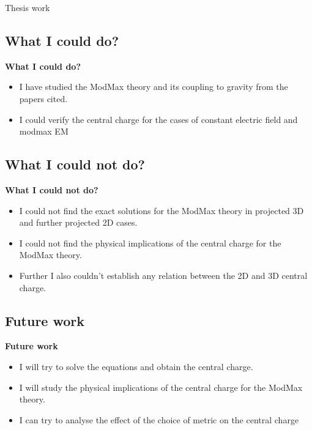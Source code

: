 \begin{frame}[allowframebreaks]{Thesis work}
    \subsection{What I could do?}
    \textbf{What I could do?}
    \begin{itemize}
        \item I have studied the ModMax theory and its coupling to gravity from the papers cited.
        \item I could verify the central charge for the cases of constant electric field and modmax EM
    \end{itemize}
    \subsection{What I could not do?}
    \textbf{What I could not do?}
    \begin{itemize}
        \item I could not find the exact solutions for the ModMax theory in projected 3D and further projected 2D cases.
        \item I could not find the physical implications of the central charge for the ModMax theory.
        \item Further I also couldn't establish any relation between the 2D and 3D central charge.
    \end{itemize}
    \subsection{Future work}
    \textbf{Future work}
    \begin{itemize}
        \item I will try to solve the equations and obtain the central charge.
        \item I will study the physical implications of the central charge for the ModMax theory.
        \item I can try to analyse the effect of the choice of metric on the central charge
    \end{itemize}
\end{frame}
